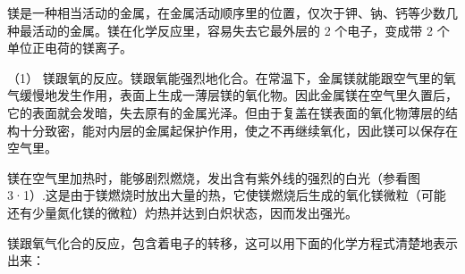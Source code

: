 镁是一种相当活动的金属，在金属活动顺序里的位置，仅次于钾、钠、钙等少数几种最活动的金属。镁在化学反应里，容易失去它最外层的
2 个电子，变成带 2 个单位正电荷的镁离子。

（1）
镁跟氧的反应。镁跟氧能强烈地化合。在常温下，金属镁就能跟空气里的氧气缓慢地发生作用，表面上生成一薄层镁的氧化物。因此金属镁在空气里久置后，它的表面就会发暗，失去原有的金属光泽。但由于复盖在镁表面的氧化物薄层的结构十分致密，能对内层的金属起保护作用，使之不再继续氧化，因此镁可以保存在空气里。

镁在空气里加热时，能够剧烈燃烧，发出含有紫外线的强烈的白光（参看图3·1）.这是由于镁燃烧时放出大量的热，它使镁燃烧后生成的氧化镁微粒（可能还有少量氮化镁的微粒）灼热并达到白炽状态，因而发出强光。

镁跟氧气化合的反应，包含着电子的转移，这可以用下面的化学方程式清楚地表示出来：

